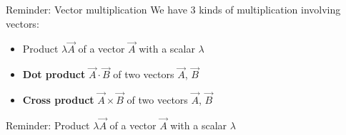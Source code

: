 {\begin{frame}{Reminder: Vector multiplication}
We have 3 kinds of multiplication involving vectors:\\
\vspace{0.4cm}
\begin{itemize}
  \item Product {\color{magenta} $\lambda \vec{A}$} of a vector $\vec{A}$ with a scalar $\lambda$\\
        \vspace{0.2cm}
  \item {\bf Dot product} {\color{magenta} $\vec{A} \cdot \vec{B}$} of two vectors $\vec{A}$, $\vec{B}$\\
        \vspace{0.2cm}
  \item {\bf Cross product} {\color{magenta} $\vec{A} \times \vec{B}$} of two vectors $\vec{A}$, $\vec{B}$
\end{itemize}
\end{frame}

%
%
%

\begin{frame}{Reminder: Product $\lambda \vec{A}$ of a vector $\vec{A}$ with a scalar $\lambda$}


\end{frame}}
